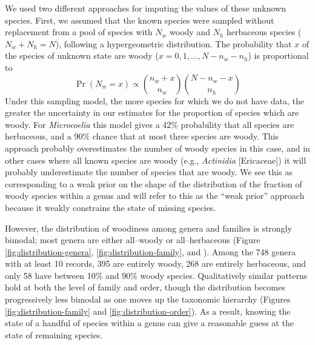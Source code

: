 \documentclass[a4paper,12pt]{article}
\begin{document}
We used two different approaches for imputing the values of these
unknown species. First, we assumed that the known species were sampled
without replacement from a pool of species with $N_w$ woody and $N_h$
herbaceous species ($N_w + N_h = N$), following a hypergeometric
distribution. The probability that $x$ of the species of unknown state
are woody ($x = 0, 1, \ldots, N - n_w - n_h$) is proportional to
\begin{equation}
  \Pr(N_w = x) \propto {n_w + x \choose n_w}
  {N - n_w - x \choose n_h}
\end{equation}
Under this sampling model, the more species for which we do not have data,
the greater the uncertainty in our estimates for the proportion of species
which are woody.
%
For \textit{Microcoelia} this model gives a 42\% probability that all
species are herbaceous, and a 90\% chance that at most three species
are woody.
This approach probably overestimates the number of woody species in
this case, and in other cases where all known species are woody (e.g.,
\textit{Actinidia} [Ericaceae]) it will probably underestimate the
number of species that are woody. We see this as corresponding to a
weak prior on the shape of the distribution of the fraction of woody
species within a genus and will refer to this as the ``weak prior''
approach because it weakly constrains the state of missing species.

However, the distribution of woodiness among genera and families is
strongly bimodal; most genera are either all--woody or all--herbaceous
(Figure \ref{fig:distribution-genera}, \ref{fig:distribution-family}, and 
\citealt{sinnott1915evolution}).  Among the 748 genera with at least 10
records, 395 are entirely woody, 268 are entirely herbaceous, and only
58 have between 10\% and 90\% woody species. Qualitatively similar patterns
hold at both the level of family and order, though the distribution
becomes progressively less bimodal as one moves up the taxonomic hierarchy 
(Figures \ref{fig:distribution-family} and \ref{fig:distribution-order}). 
As a result, knowing the state of a handful of species within a genus 
can give a reasonable guess at the state of remaining species.
\end{document}
